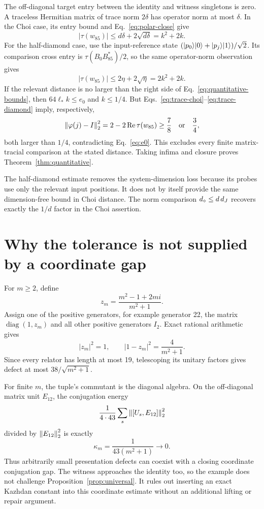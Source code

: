 The off-diagonal target entry between the identity and witness singletons is zero.
A traceless Hermitian matrix of trace norm $2\delta$ has operator norm at most $\delta$.
In the Choi case, its entry bound and Eq.~\eqref{eq:polar-close} give
\begin{equation}
 |\tau(w_{85})|\le d\delta+2\sqrt{d\delta}=k^2+2k.
 \label{eq:trace-choi}
\end{equation}
For the half-diamond case, use the input-reference state
$(\lvert p_0\rangle\lvert 0\rangle+\lvert p_j\rangle\lvert 1\rangle)/\sqrt2$. Its comparison cross entry is
$\tau(B_0B_{85}^*)/2$, so the same operator-norm observation gives
\begin{equation}
 |\tau(w_{85})|\le2\eta+2\sqrt\eta=2k^2+2k.
 \label{eq:trace-diamond}
\end{equation}
If the relevant distance is no larger than the right side of
Eq.~\eqref{eq:quantitative-bounds}, then $64\ell_*k\le e_0$ and $k\le1/4$.
But Eqs.~\eqref{eq:trace-choi}--\eqref{eq:trace-diamond} imply, respectively,
\[
 \left\lVert \varphi(j)-I\right\rVert_2^2=2-2\operatorname{Re}\tau(w_{85})
 \ge\frac78\quad\text{or}\quad\frac34,
\]
both larger than $1/4$, contradicting Eq.~\eqref{eq:e0}.
This excludes every finite matrix-tracial comparison at the stated distance. Taking infima
and closure proves Theorem~\ref{thm:quantitative}.

The half-diamond estimate removes the system-dimension loss because its probes use only
the relevant input positions. It does not by itself provide the same dimension-free bound
in Choi distance. The norm comparison $d_\diamond\le d\,d_J$ recovers exactly the
$1/d$ factor in the Choi assertion.

\section{Why the tolerance is not supplied by a coordinate gap}\label{sec:gap}

For $m\ge2$, define
\[
 z_m=\frac{m^2-1+2mi}{m^2+1}.
\]
Assign one of the positive generators, for example generator 22, the matrix
$\operatorname{diag}(1,z_m)$ and all other positive generators $I_2$.
Exact rational arithmetic gives
\begin{equation}
 |z_m|^2=1,\qquad |1-z_m|^2=\frac4{m^2+1}.
\end{equation}
Since every relator has length at most 19, telescoping its unitary factors gives defect
at most $38/\sqrt{m^2+1}$.

For finite $m$, the tuple's commutant is the diagonal algebra. On the off-diagonal matrix
unit $E_{12}$, the conjugation energy
\[
 \frac1{4\cdot43}\sum_s\left\lVert [U_s,E_{12}]\right\rVert_2^2
\]
divided by $\left\lVert E_{12}\right\rVert_2^2$ is exactly
\begin{equation}
 \kappa_m=\frac1{43(m^2+1)}\longrightarrow0.
\end{equation}
Thus arbitrarily small presentation defects can coexist with a closing coordinate
conjugation gap. The witness approaches the identity too, so the example does not challenge
Proposition~\ref{prop:universal}. It rules out inserting an exact Kazhdan constant into
this coordinate estimate without an additional lifting or repair argument.

